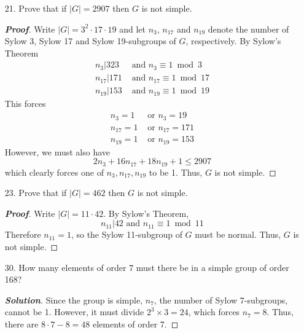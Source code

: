 \documentclass[12pt,leqno]{book}
\theoremstyle{definition}
\newenvironment{Proof}{\begin{proof}[\textnormal{\textbf{Proof}}]}{\end{proof}}
\newenvironment{Solution}{\begin{proof}[\textnormal{\textbf{Solution}}]}{\end{proof}}
\begin{document}
\begin{enumerate}
 \item [21.] Prove that if $|G|=2907$ then $G$ is not simple.
\begin{Proof}
 Write $|G|=3^2\cdot17\cdot19$ and let $n_3$, $n_{17}$ and $n_{19}$ denote the number of Sylow 3, Sylow 17 and Sylow 19-subgroups of $G$, respectively. By Sylow's Theorem \begin{align*}n_3|323&\text{ and }n_3\equiv1\bmod{3}\\n_{17}|171&\text{  and  }n_{17}\equiv1\bmod{17}\\n_{19}|153&\text{  and  }n_{19}\equiv1\bmod{19}\end{align*} This forces \begin{align*}n_3=1&\text{ or }n_3=19\\n_{17}=1&\text{ or }n_{17}=171\\n_{19}=1&\text{ or }n_{19}=153\end{align*} However, we must also have \[2n_3+16n_{17}+18n_{19}+1\leq2907\] which clearly forces one of $n_3,n_{17},n_{19}$ to be 1. Thus, $G$ is not simple.
\end{Proof}

 \item [23.] Prove that if $|G|=462$ then $G$ is not simple.
\begin{Proof}
 Write $|G|=11\cdot42$. By Sylow's Theorem, \[n_{11}|42\text{ and }n_{11}\equiv1\bmod{11}\] Therefore $n_{11}=1$, so the Sylow 11-subgroup of $G$ must be normal. Thus, $G$ is not simple.
\end{Proof}

 \item [30.] How many elements of order 7 must there be in a simple group of order 168?
\begin{Solution}
 Since the group is simple, $n_7$, the number of Sylow 7-subgroups, cannot be 1. However, it must divide $2^3\times3=24$, which forces $n_7=8$. Thus, there are $8\cdot7-8=48$ elements of order 7.
\end{Solution}

\end{enumerate}
\end{document}
